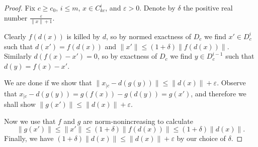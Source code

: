 \begin{proof}
  \leanok
  Fix $c \ge c_0$, $i \le m$, $x \in C_{kc}^i$, and $\varepsilon > 0$.
  Denote by $\delta$ the positive real number
  $\frac{\varepsilon}{\|x\| + 1}$.

  Clearly $f(d(x))$ is killed by $d$,
  so by normed exactness of $D_c$ we find $x' \in D_c^i$
  such that $d(x') = f(d(x))$ and $\|x'\| \le (1 + \delta)\|f(d(x))\|$.
  Similarly $d(f(x) - x') = 0$,
  so by exactness of $D_c$ we find $y \in D_c^{i-1}$
  such that $d(y) = f(x) - x'$.

  We are done if we show that
  $\|x_{|c} - d(g(y))\| \le \|d(x)\| + \varepsilon$.
  Observe that $x_{|c} - d(g(y)) = g(f(x)) - g(d(y)) = g(x')$,
  and therefore we shall show $\|g(x')\| \le \|d(x)\| + \varepsilon$.

  Now we use that $f$ and $g$ are norm-nonincreasing to calculate
  \[
    \|g(x')\| \le \|x'\| \le (1 + \delta) \|f(d(x))\| \le (1 + \delta) \|d(x)\|.
  \]
  Finally, we have $(1 + \delta) \|d(x)\| \le \|d(x)\| + \varepsilon$
  by our choice of $\delta$.
\end{proof}

%
%

